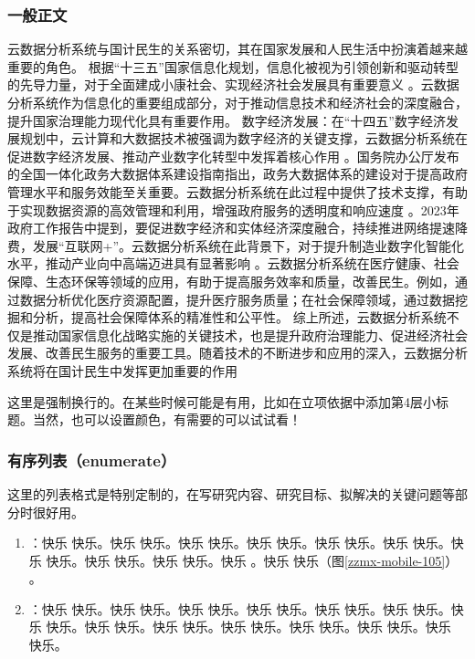 
\subsubsection{一般正文}

\justifying

\indent\setlength{\parindent}{2em}%

云数据分析系统与国计民生的关系密切，其在国家发展和人民生活中扮演着越来越重要的角色。
根据“十三五”国家信息化规划，信息化被视为引领创新和驱动转型的先导力量，对于全面建成小康社会、实现经济社会发展具有重要意义
。云数据分析系统作为信息化的重要组成部分，对于推动信息技术和经济社会的深度融合，提升国家治理能力现代化具有重要作用。
数字经济发展：在“十四五”数字经济发展规划中，云计算和大数据技术被强调为数字经济的关键支撑，云数据分析系统在促进数字经济发展、推动产业数字化转型中发挥着核心作用
。国务院办公厅发布的全国一体化政务大数据体系建设指南指出，政务大数据体系的建设对于提高政府管理水平和服务效能至关重要。云数据分析系统在此过程中提供了技术支撑，有助于实现数据资源的高效管理和利用，增强政府服务的透明度和响应速度
。2023年政府工作报告中提到，要促进数字经济和实体经济深度融合，持续推进网络提速降费，发展“互联网+”。云数据分析系统在此背景下，对于提升制造业数字化智能化水平，推动产业向中高端迈进具有显著影响
。云数据分析系统在医疗健康、社会保障、生态环保等领域的应用，有助于提高服务效率和质量，改善民生。例如，通过数据分析优化医疗资源配置，提升医疗服务质量；在社会保障领域，通过数据挖掘和分析，提高社会保障体系的精准性和公平性。
综上所述，云数据分析系统不仅是推动国家信息化战略实施的关键技术，也是提升政府治理能力、促进经济社会发展、改善民生服务的重要工具。随着技术的不断进步和应用的深入，云数据分析系统将在国计民生中发挥更加重要的作用
\indent\setlength{\parindent}{2em}

这里是强制换行的。在某些时候可能是有用，比如在立项依据中添加第4层小标题。当然，也可以设置颜色，有需要的可以试试看！

\subsubsection{有序列表（enumerate）}
\indent\setlength{\parindent}{2em}

这里的列表格式是特别定制的，在写研究内容、研究目标、拟解决的关键问题等部分时很好用。

\begin{enumerate}
    \item {}：快乐 快乐。快乐 快乐。快乐 快乐。快乐 快乐。快乐 快乐。快乐 快乐。快乐 快乐。快乐 快乐。快乐 快乐。快乐 。快乐 快乐（图\ref{zzmx-mobile-105}） 。
    \item {}：快乐 快乐。快乐 快乐。快乐 快乐。快乐 快乐。快乐 快乐。快乐 快乐。快乐 快乐。快乐 快乐。快乐 快乐。快乐 快乐。快乐 快乐。快乐 快乐。快乐 快乐。
\end{enumerate}


